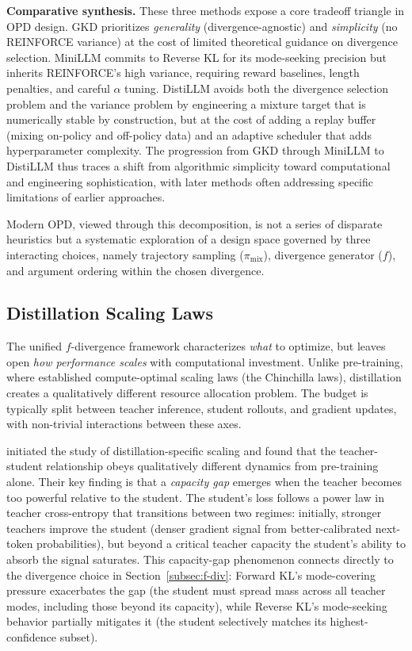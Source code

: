 \documentclass{article} %
\begin{document}
\textbf{Comparative synthesis.} These three methods expose a core tradeoff triangle in OPD design. GKD prioritizes \emph{generality} (divergence-agnostic) and \emph{simplicity} (no REINFORCE variance) at the cost of limited theoretical guidance on divergence selection. MiniLLM commits to Reverse KL for its mode-seeking precision but inherits REINFORCE's high variance, requiring reward baselines, length penalties, and careful $\alpha$ tuning. DistiLLM avoids both the divergence selection problem and the variance problem by engineering a mixture target that is numerically stable by construction, but at the cost of adding a replay buffer (mixing on-policy and off-policy data) and an adaptive scheduler that adds hyperparameter complexity. The progression from GKD through MiniLLM to DistiLLM thus traces a shift from algorithmic simplicity toward computational and engineering sophistication, with later methods often addressing specific limitations of earlier approaches.

Modern OPD, viewed through this decomposition, is not a series of disparate heuristics but a systematic exploration of a design space governed by three interacting choices, namely trajectory sampling ($\pi_{\mathrm{mix}}$), divergence generator ($f$), and argument ordering within the chosen divergence.

\subsection{Distillation Scaling Laws}
\label{subsec:scaling}

The unified $f$-divergence framework characterizes \emph{what} to optimize, but leaves open \emph{how performance scales} with computational investment. Unlike pre-training, where \citet{2203.15556} established compute-optimal scaling laws (the Chinchilla laws), distillation creates a qualitatively different resource allocation problem. The budget is typically split between teacher inference, student rollouts, and gradient updates, with non-trivial interactions between these axes.

\citet{2502.08606} initiated the study of distillation-specific scaling and found that the teacher-student relationship obeys qualitatively different dynamics from pre-training alone. Their key finding is that a \emph{capacity gap} emerges when the teacher becomes too powerful relative to the student. The student's loss follows a power law in teacher cross-entropy that transitions between two regimes: initially, stronger teachers improve the student (denser gradient signal from better-calibrated next-token probabilities), but beyond a critical teacher capacity the student's ability to absorb the signal saturates. This capacity-gap phenomenon connects directly to the divergence choice in Section~\ref{subsec:f-div}: Forward KL's mode-covering pressure exacerbates the gap (the student must spread mass across all teacher modes, including those beyond its capacity), while Reverse KL's mode-seeking behavior partially mitigates it (the student selectively matches its highest-confidence subset).
\end{document}
